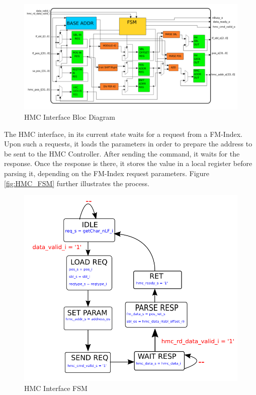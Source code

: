 \begin{figure}[H]
    \centering
    \hspace*{-20mm}\includegraphics[scale = 0.3 ]{Figures/HMC_DIAG.png}
    \caption{HMC Interface Bloc Diagram}
    \label{fig:HMC_DIAG}
\end{figure}

The HMC interface, in its current state waits for a request from a FM-Index. Upon such a requests, it loads the parameters in order to prepare the address to be sent to the HMC Controller. After sending the command, it waits for the response. Once the response is there, it stores the value in a local register before parsing it, depending on the FM-Index request parameters. Figure \ref{fig:HMC_FSM} further illustrates the process.

\begin{figure}[H]
    \centering
    \hspace*{-20mm}\includegraphics[scale = 0.45]{Figures/HMC_FSM.png}
    \caption{HMC Interface FSM}
    \label{fig:HMC_DIAG}
\end{figure}


